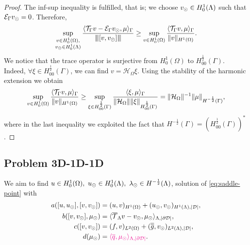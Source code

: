 \documentclass[r]{siamart171218}
\newcommand{\paolo}[1]{{\color{magenta}#1}}
\begin{document}
\begin{proof}

The inf-sup inequality is fulfilled, that is; 
we choose $v_{\odot} \in H^1_0(\Lambda)$ such that $\mathcal{E}_\Gamma v_{\odot} =0$. Therefore,
\begin{equation*}
\sup _{\substack{v\in H^1_0(\Omega),\\ v_{\odot} \in H^1_0(\Lambda)}} \frac{ \langle {\mathcal{T}_\Gamma} v  - \mathcal{E}_\Gamma v_{\odot}, \mu\rangle_\Gamma}{{\left\vert\kern-0.25ex\left\vert\kern-0.25ex\left\vert [v, v_{\odot}] \right\vert\kern-0.25ex\right\vert\kern-0.25ex\right\vert}} 
\geq \sup _{v\in H^1_0(\Omega)} \frac{ \langle {\mathcal{T}_\Gamma} v, \mu \rangle_\Gamma}{\|v\|_{H^1(\Omega)}}.
\end{equation*}
We notice that the trace operator is surjective from $H^1_0(\Omega)$ to $H^{\frac12}_{00}(\Gamma)$. Indeed, $\forall \xi \in H^{\frac 12}_{00}(\Gamma)$, 
we  can find $v=\mathcal{H}_\Omega \xi$. Using the stability of the harmonic extension we obtain
\begin{equation}\label{infsup_traceop}
\sup _{v\in H^1_0(\Omega)} \frac{ \langle \trace v, \mu \rangle_\Gamma}{\|v\|_{H^1(\Omega)}}
\geq  \sup _{\xi \in H^{\frac 12}_{00}(\Gamma )} \frac{ \langle \xi , \mu \rangle_\Gamma}{\|\mathcal{H}_\Omega\| \|\xi\|_{H^{\frac 12}_{00}(\Gamma)}}
= \|\mathcal{H}_\Omega\|^{-1} \|\mu\|_{H^{-\frac 12}(\Gamma)},
\end{equation}
where in the last inequality we exploited the fact that $H^{-\frac 12}(\Gamma)=(H^{\frac 12 }_{00}(\Gamma))^*$. 
\end{proof}

\subsection{Problem 3D-1D-1D}
We aim to find $u \in H^1_0(\Omega),\ u_{\odot} \in H^1_0(\Lambda), \ \lambda_{\odot} \in H^{-\frac12}(\Lambda)$,
solution of \eqref{eq:saddle-point} with
\begin{align*}
a([u, \ud], [v, \vd])&= (u,v)_{H^1(\Omega)} + (\ud,\vd)_{H^1(\Lambda),|\D|},
\\
b([v, \vd], \md)&=  \langle  \mtrace v - \vd, \md \rangle_{\Lambda, |\DD|},
\\
c([v,\vd])&= (f,v)_{L^2(\Omega)} + (\avrd{g},\vd)_{L^2(\Lambda),|\D|},
\\
d(\md)&=\paolo{\langle \avrc{q},\md\rangle_{\Lambda,|\DD|}}.
\end{align*}
\end{document}
